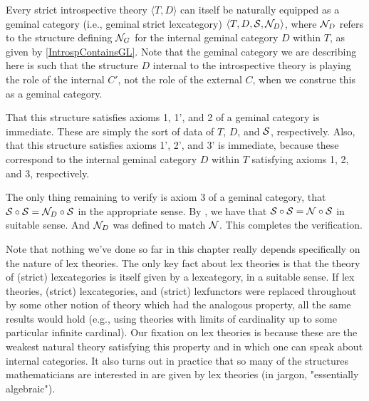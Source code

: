 \documentclass[./main.tex]{subfiles}
\begin{document}
\begin{construction}
Every strict introspective theory $\langle T, D \rangle$ can itself be naturally equipped as a geminal category (i.e., geminal strict lexcategory) $\langle T, D, \mathcal{S}, \mathcal{N}_{D} \rangle$, where $\mathcal{N}_{D}$ refers to the structure defining $\mathcal{N}_{G}$ for the internal geminal category $D$ within $T$, as given by \cref{IntrospContainsGL}. Note that the geminal category we are describing here is such that the structure $D$ internal to the introspective theory is playing the role of the internal $C'$, not the role of the external $C$, when we construe this as a geminal category.

That this structure satisfies axioms 1, 1', and 2 of a geminal category is immediate. These are simply the sort of data of $T$, $D$, and $\mathcal{S}$, respectively. Also, that this structure satisfies axioms 1', 2', and 3' is immediate, because these correspond to the internal geminal category $D$ within $T$ satisfying axioms 1, 2, and 3, respectively.

The only thing remaining to verify is axiom 3 of a geminal category, that $\mathcal{S} \circ \mathcal{S} = \mathcal{N}_{D} \circ \mathcal{S}$ in the appropriate sense. By , we have that $\mathcal{S} \circ \mathcal{S} = \mathcal{N} \circ \mathcal{S}$ in suitable sense. And $\mathcal{N}_{D}$ was defined to match $\mathcal{N}$. This completes the verification.
\end{construction}

Note that nothing we've done so far in this chapter really depends specifically on the nature of lex theories. The only key fact about lex theories is that the theory of (strict) lexcategories is itself given by a lexcategory, in a suitable sense. If lex theories, (strict) lexcategories, and (strict) lexfunctors were replaced throughout by some other notion of theory which had the analogous property, all the same results would hold (e.g., using theories with limits of cardinality up to some particular infinite cardinal). Our fixation on lex theories is because these are the weakest natural theory satisfying this property and in which one can speak about internal categories. It also turns out in practice that so many of the structures mathematicians are interested in are given by lex theories (in jargon, "essentially algebraic").
\end{document}
